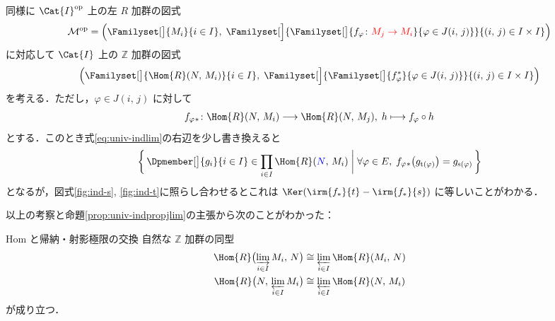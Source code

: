 \documentclass[algtopo_main]{subfiles}
\begin{document}
同様に $\Cat{I}^{\mathrm{op}}$ 上の左 $R$ 加群の図式
\begin{align}
	\mathcal{M}^{\mathrm{op}} = \Bigl( \Familyset[\big]{M_i}{i \in I},\; \Familyset[\Big]{\Familyset[\big]{f_\varphi \colon \textcolor{red}{M_j \to M_i}}{\varphi \in J(i,\, j)}}{(i,\, j) \in I \times I} \Bigr)
\end{align}
に対応して $\Cat{I}$ 上の $\mathbb{Z}$ 加群の図式
\begin{align}
	\Bigl( \Familyset[\big]{\Hom{R}(N,\, M_i)}{i \in I},\; \Familyset[\Big]{\Familyset[\big]{f^*_\varphi}{\varphi \in J(i,\, j)}}{(i,\, j) \in I \times I} \Bigr)
\end{align}
を考える．ただし，$\varphi \in J(i,\, j)$ に対して
\begin{align}
	f_\varphi{}_* \colon \Hom{R}(N,\, M_i) \lto \Hom{R}(N,\, M_j),\; h \lmto f_\varphi \circ h
\end{align}
とする．このとき式\eqref{eq:univ-indlim}の右辺を少し書き換えると
\begin{align}
	\biggl\{\, \Dpmember[\big]{g_i}{i \in I} \in \prod_{i \in I} \Hom{R}(\textcolor{blue}{N},\, M_i) \biggm| \forall \varphi \in E,\; f_\varphi{}_* \bigl( g_{\mathrm{t}(\varphi)} \bigr) = g_{\mathrm{s}(\varphi)} \,\biggr\}
\end{align}
となるが，図式\ref{fig:ind-s}, \ref{fig:ind-t}に照らし合わせるとこれは $\Ker (\irm{f_*}{t} - \irm{f_*}{s})$ に等しいことがわかる．

以上の考察と命題\ref{prop:univ-indpropjlim}の主張から次のことがわかった：

\begin{myprop}[label=prop:comm-lim2Hom]{$\mathrm{Hom}$ と帰納・射影極限の交換}
	自然な $\mathbb{Z}$ 加群の同型
	\begin{align}
		\Hom{R} \bigl( \varinjlim_{i \in I} M_i,\, N \bigr) &\cong \varprojlim_{i \in I} \Hom{R} (M_i,\, N) \\
		\Hom{R} \bigl(N,\, \varprojlim_{i \in I} M_i\bigr) &\cong \varprojlim_{i \in I} \Hom{R} (N,\, M_i)
	\end{align}
	が成り立つ．
\end{myprop}
\end{document}
